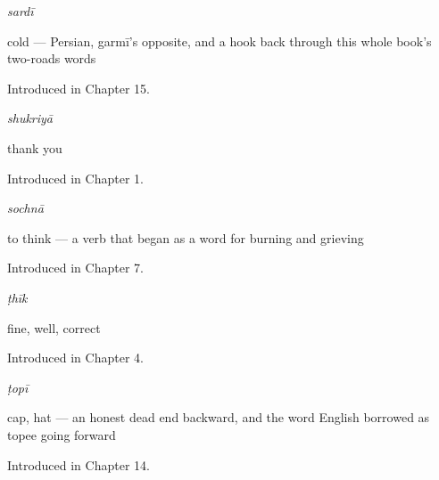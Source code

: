 \noindent\begin{minipage}[t]{\linewidth}
\raggedright
\textbf{}\enspace\emph{sardī}\par
\small cold — Persian, garmī's opposite, and a hook back through this whole book's two-roads words\par
\footnotesize Introduced in Chapter 15.
\end{minipage}\par\medskip

\noindent\begin{minipage}[t]{\linewidth}
\raggedright
\textbf{}\enspace\emph{shukriyā}\par
\small thank you\par
\footnotesize Introduced in Chapter 1.
\end{minipage}\par\medskip

\noindent\begin{minipage}[t]{\linewidth}
\raggedright
\textbf{}\enspace\emph{sochnā}\par
\small to think — a verb that began as a word for burning and grieving\par
\footnotesize Introduced in Chapter 7.
\end{minipage}\par\medskip

\noindent\begin{minipage}[t]{\linewidth}
\raggedright
\textbf{}\enspace\emph{ṭhīk}\par
\small fine, well, correct\par
\footnotesize Introduced in Chapter 4.
\end{minipage}\par\medskip

\noindent\begin{minipage}[t]{\linewidth}
\raggedright
\textbf{}\enspace\emph{ṭopī}\par
\small cap, hat — an honest dead end backward, and the word English borrowed as topee going forward\par
\footnotesize Introduced in Chapter 14.
\end{minipage}\par\medskip
